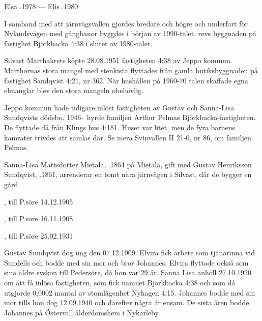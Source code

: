 Elsa .1978  ---  Elis .1980





I samband med att järnvägsvallen gjordes bredare och högre och underfart för Nylandsvägen med gångbanor byggdes i början av 1990-talet, revs byggnaden på fastighet Björkbacka 4:38 i slutet av 1980-talet.


Silvast Marthakrets köpte 28.08.1951 fastigheten 4:38 av Jeppo kommun. Marthornas stora mangel med stenkista flyttades från gamla 	butiksbyggnaden på fastighet Sandqvist 4:21, nr 362. När hushållen på 1960-70 talen skaffade egna elmanglar blev den stora mangeln obehövlig.

Jeppo kommun hade tidigare inlöst fastigheten av Gustav och Sanna-Lisa Sundqvists dödsbo. 1946-- hyrde familjen Arthur Pelmas Björkbacka-fastigheten. De flyttade då från Klings hus 4:181. Huset var litet, men de fyra barnens kamrater trivdes att samlas där. Se mera Svinvallen II 21-0, nr 86, om familjen Pelmas.


Sanna-Lisa Mattsdotter Mietala, .1864 på Mietala, gift med Gustav Henriksson Sundqvist, .1861, arrenderar en tomt nära järnvägen i Silvast, där de bygger en gård.
\begin{jhchildren}
  \item {}
  \item {}, till P.söre 14.12.1905
  \item {}, till P.söre 16.11.1908
  \item {}
  \item {}, till P.söre 25.02.1931
\end{jhchildren}
Gustav Sundqvist dog ung den 07.12.1909. Elvira fick arbete som tjänarinna vid Sundells och bodde med sin mor	och bror Johannes. Elvira flyttade också som sina äldre syskon till Pedersöre, då hon var 29 år. Sanna Lisa anhöll 27.10.1920 om att få inlösa fastigheten, som fick namnet Björkbacka 4:38 och som då utgjorde 0,0002 mantal av stomlägenhet Nyhagen 4:15. Johannes bodde med sin mor tills hon dog 12.09.1940 och därefter några år ensam. De sista åren bodde Johannes på Östervall ålderdomshem i Nykarleby.



